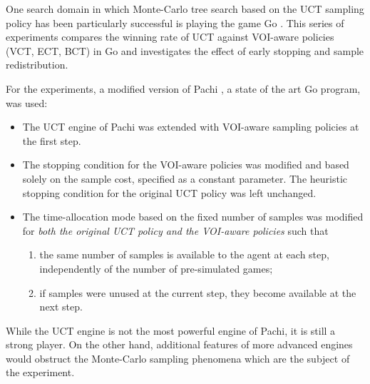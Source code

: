\documentclass{article}
\begin{document}
One search domain in which Monte-Carlo tree search based on the UCT
sampling policy has been particularly successful is playing the game Go
\cite{Gelly.mogo}. This series of experiments compares
the winning rate of UCT against VOI-aware policies (VCT, ECT, BCT)
in Go and investigates the effect of early stopping and sample
redistribution. 

For the experiments, a modified version of Pachi \cite{Braudis.pachi},
a state of the art Go program, was used:
\begin{itemize}
\item The UCT engine of Pachi was extended with VOI-aware sampling
  policies at the first step. 
\item The stopping condition for the VOI-aware policies was
  modified and based solely on the sample cost, specified as
  a constant parameter. The heuristic stopping condition for the
  original UCT policy was left unchanged.
\item The time-allocation mode based on the fixed number of samples
  was modified for \textit{both the original UCT policy and the VOI-aware
  policies} such that 
  \begin{enumerate}
    \item the same number of samples is available to
      the agent at each step, independently of the number of pre-simulated
      games;  
    \item if samples were unused at the current step,
      they become available at the next step. 
  \end{enumerate}
\end{itemize}
While the UCT engine is not the most powerful engine of Pachi, it is
still a strong player. On the other hand, additional features of more
advanced engines would obstruct the Monte-Carlo sampling phenomena
which are the subject of the experiment. 
\end{document}
